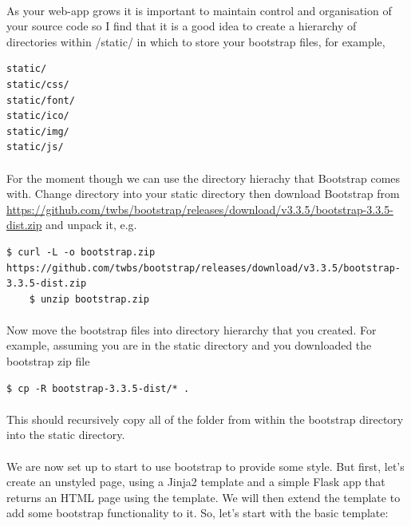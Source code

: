 \documentclass[12pt, a4paper, oneside]{book}
\begin{document}
{\paragraph{} As your web-app grows it is important to maintain control and organisation of your source code so I find that it is a good idea to create a hierarchy of directories within /static/ in which to store your bootstrap files, for example,

\begin{lstlisting}[style=DOS]
static/
static/css/
static/font/
static/ico/
static/img/
static/js/
\end{lstlisting}

\paragraph{} For the moment though we can use the directory hierachy that Bootstrap comes with. Change directory into your static directory  then download Bootstrap from \url{https://github.com/twbs/bootstrap/releases/download/v3.3.5/bootstrap-3.3.5-dist.zip} and unpack it, e.g.

\begin{lstlisting}[style=DOS]
    $ curl -L -o bootstrap.zip https://github.com/twbs/bootstrap/releases/download/v3.3.5/bootstrap-3.3.5-dist.zip
    $ unzip bootstrap.zip
\end{lstlisting}

\paragraph{} Now move the bootstrap files into directory hierarchy that you created. For example, assuming you are in the static directory and you downloaded the bootstrap zip file

\begin{lstlisting}[style=DOS]
    $ cp -R bootstrap-3.3.5-dist/* .
\end{lstlisting}

\paragraph{} This should recursively copy all of the folder from within the bootstrap directory into the static directory.

\paragraph{} We are now set up to start to use bootstrap to provide some style. But first, let's create an unstyled page, using a Jinja2 template and a simple Flask app that returns an HTML page using the template. We will then extend the template to add some bootstrap functionality to it. So, let's start with the basic template:

}
\end{document}
